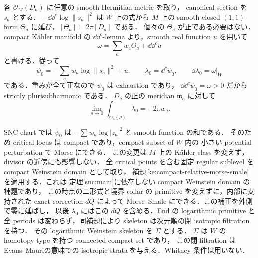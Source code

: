 各 $\mathcal O_M(D_a)$ に任意の smooth Hermitian metric を取り，
canonical section を $s_a$ とする．
$-\dd\dd^c\log\|s_a\|^2$ は $W$ 上の式から $M$ 上の smooth closed
$(1,1)$-form $\Theta_a$ に延び，$[\Theta_a]=2\pi[D_a]$ である．
個々の $\Theta_a$ が正である必要はない．
compact Kähler manifold の $\dd\dd^c$-lemma より，smooth real function $u$ を用いて
\[
 \omega=\sum_a w_a\Theta_a+\dd\dd^c u
\]
と書ける\cite[Lemma (5.11), pp.~266--267; Remark (5.14)]{DGMS}．従って
\begin{equation}\label{snc:log-potential}
 \psi_0=-\sum_a w_a\log\|s_a\|^2+u,\qquad
 \lambda_0=\dd^c\psi_0,\qquad
 \dd\lambda_0=\omega|_W
\end{equation}
である．重みが全て正なので $\psi_0$ は exhaustion であり，
$\dd\dd^c\psi_0=\omega>0$ だから strictly plurisubharmonic である．
$D_a$ の正の meridian $\mathfrak m_a$ に対して
\begin{equation}\label{snc:residues}
 \lim_{\rho\to0}\int_{\mathfrak m_a(\rho)}\lambda_0=-2\pi w_a.
\end{equation}

SNC chart では $\psi_0$ は $-\sum w_a\log|z_a|^2$ と smooth function の和である．
そのため critical locus は compact であり，compact subset of $W$ 内の
小さい potential perturbation で Morse にできる．
この変更は $M$ 上の Kähler class を変えず，divisor の近傍にも影響しない．
全 critical points を含む固定 regular sublevel を compact Weinstein domain として取り，
補題\ref{ke:compact-relative-morse-smale}を適用する．これは
定理\ref{snc:main}に依存しない compact Weinstein domain の補題であり，
この時点の二形式と境界 collar の primitive を変えずに，内部に支持された
exact correction $dQ$ によって Morse--Smale にできる．この補正を外側で零に延ばし，
以後 $\lambda_0$ にはこの $dQ$ を含める．End の logarithmic primitive と全 periods
は変わらず，同補題により skeleton は次元順の閉 isotropic filtration を持つ．
その logarithmic Weinstein skeleton を $\Sigma$ とする．
$\Sigma$ は $W$ の homotopy type を持つ connected compact set であり，
この閉 filtration は Evans--Mauri\cite[Definitions~2.1 and 2.5]{EM}の意味での
isotropic strata を与える．Whitney 条件は用いない．

